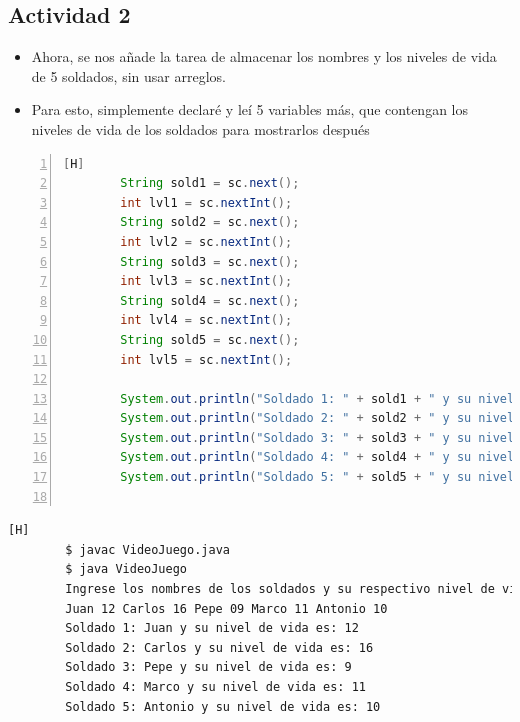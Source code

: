 \documentclass{article}
\begin{document}
	\subsection{Actividad 2}
	\begin{itemize}
		\item Ahora, se nos añade la tarea de almacenar los nombres y los niveles de vida de 5 soldados, sin usar arreglos.
		\item Para esto, simplemente declaré y leí 5 variables más, que contengan los niveles de vida de los soldados para mostrarlos después
	\end{itemize}
	\begin{lstlisting}[language=java,caption={Los 5 soldados + Los 5 niveles de vida}, numbers=left][H]
		String sold1 = sc.next();
        int lvl1 = sc.nextInt();
        String sold2 = sc.next();
        int lvl2 = sc.nextInt();
        String sold3 = sc.next();
        int lvl3 = sc.nextInt();
        String sold4 = sc.next();
        int lvl4 = sc.nextInt();
        String sold5 = sc.next();
        int lvl5 = sc.nextInt();
        
        System.out.println("Soldado 1: " + sold1 + " y su nivel de vida es: " + lvl1);
        System.out.println("Soldado 2: " + sold2 + " y su nivel de vida es: " + lvl2);
        System.out.println("Soldado 3: " + sold3 + " y su nivel de vida es: " + lvl3);
        System.out.println("Soldado 4: " + sold4 + " y su nivel de vida es: " + lvl4);
        System.out.println("Soldado 5: " + sold5 + " y su nivel de vida es: " + lvl5);
        
	\end{lstlisting}
	\begin{lstlisting}[language=bash,caption={Ejecutando y nombrando soldados}][H]
		$ javac VideoJuego.java
		$ java VideoJuego
		Ingrese los nombres de los soldados y su respectivo nivel de vida:
		Juan 12 Carlos 16 Pepe 09 Marco 11 Antonio 10
		Soldado 1: Juan y su nivel de vida es: 12
		Soldado 2: Carlos y su nivel de vida es: 16
		Soldado 3: Pepe y su nivel de vida es: 9
		Soldado 4: Marco y su nivel de vida es: 11
		Soldado 5: Antonio y su nivel de vida es: 10
	\end{lstlisting}
\end{document}
